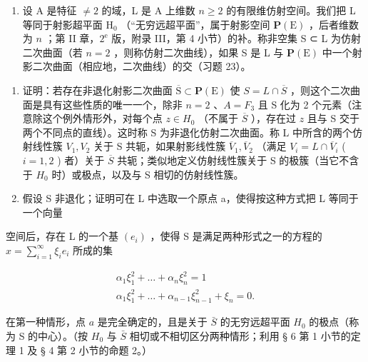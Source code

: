 \begin{enumerate}
\def\labelenumi{\arabic{enumi})}
\setcounter{enumi}{24}
\tightlist
\item
  设 A 是特征 \(\neq 2\) 的域，L 是 A 上维数 \(n \geqslant 2\) 的有限维仿射空间。我们把 L 等同于射影超平面 \(\mathrm{H}_{0}\) （“无穷远超平面”，属于射影空间 \(\mathbf{P}(\mathrm{E})\) ，后者维数为 \(n\) ；第 II 章，\(2^{\mathrm{e}}\) 版，附录 III，第 4 小节）的补。称非空集 S ⊂ L 为仿射二次曲面（若 \(n = 2\) ，则称仿射二次曲线），如果 S 是 L 与 \(\mathbf{P}(\mathrm{E})\) 中一个射影二次曲面（相应地，二次曲线）的交（习题 23）。
\end{enumerate}

\begin{enumerate}
\def\labelenumi{\alph{enumi})}
\item
  证明：若存在非退化射影二次曲面 \(\overline{\mathrm{S}}\subset\mathbf{P}(\mathrm{E})\) 使 \(S=L\cap\overline{S}\) ，则这个二次曲面是具有这些性质的唯一一个，除非 \(n=2\) 、\(A=F_{3}\) 且 S 化为 2 个元素（注意除这个例外情形外，对每个点 \(z\in H_{0}\) （不属于 \(\overline{S}\) ），存在过 \(z\) 且与 S 交于两个不同点的直线）。这时称 S 为非退化仿射二次曲面。称 L 中所含的两个仿射线性簇 \(V_{1},V_{2}\) 关于 S 共轭，如果射影线性簇 \(\overline{V}_{1},\overline{V}_{2}\) （满足 \(V_{i}=L\cap\overline{V}_{i}\) ( \(i=1,2\) ) 者）关于 \(\overline{S}\) 共轭；类似地定义仿射线性簇关于 S 的极簇（当它不含于 \(H_{0}\) 时）或极点，以及与 S 相切的仿射线性簇。
\item
  假设 S 非退化；证明可在 L 中选取一个原点 a，使得按这种方式把 L 等同于一个向量
\end{enumerate}

空间后，存在 L 的一个基 \((e_i)\) ，使得 S 是满足两种形式之一的方程的 \(x = \sum_{i=1}^{\infty} \xi_i e_i\) 所成的集

\[
\begin{array}{c} \alpha_ {1} \xi_ {1} ^ {2} + \dots + \alpha_ {n} \xi_ {n} ^ {2} = 1 \\ \alpha_ {1} \xi_ {1} ^ {2} + \dots + \alpha_ {n - 1} \xi_ {n - 1} ^ {2} + \xi_ {n} = 0. \end{array}
\]

在第一种情形，点 \(a\) 是完全确定的，且是关于 \(\bar{S}\) 的无穷远超平面 \(H_{0}\) 的极点（称为 S 的中心）。（按 \(H_{0}\) 与 \(\bar{S}\) 相切或不相切区分两种情形；利用 § 6 第 1 小节的定理 1 及 § 4 第 2 小节的命题 2。）


